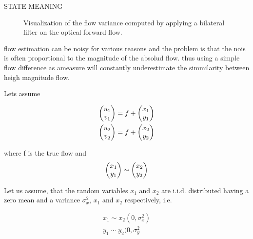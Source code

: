 STATE MEANING

\begin{figure}[H]
\begin{center}
\end{center}
\caption[Flow Variance]{Visualization of the flow variance computed by applying a bilateral filter on the optical forward flow.}
\label{fig:flow_variance}
\end{figure}


flow estimation can be noisy for various reasons and the problem is that the nois is often proportional to the magnitude of the absolud flow. thus using a simple flow difference as ameasure will constantly underestimate the simmilarity between heigh magnitude flow. 

Lets assume 

\begin{equation}
\begin{aligned}
\colvec{u_1}{v_1} = f + \colvec{x_1}{y_1} \\
\colvec{u_2}{v_2} = f + \colvec{x_2}{y_2}
\end{aligned}
\label{eq:def_flow_tracking}	
\end{equation}

where f is the true flow and 
\begin{equation}
	\colvec{x_1}{y_1} \sim \colvec{x_2}{y_2}
\end{equation}

Let us assume, that the random variables $x_1$ and $x_2$ are i.i.d. distributed having a zero mean and a variance $\sigma_x^2$, $x_1$ and $x_2$ respectively, i.e.

\begin{equation}
\begin{aligned}
x_1 \sim x_2 (0, \sigma_x^2) \\
y_1 \sim y_2 (0, \sigma_y^2
\end{aligned}
\label{eq:def_flow_tracking}	
\end{equation}

